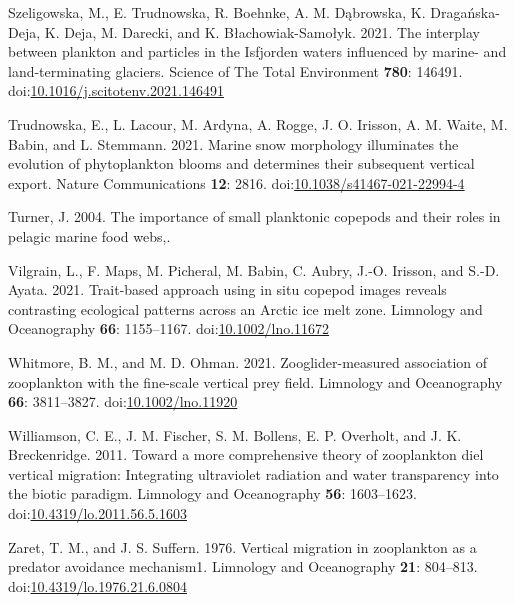 \documentclass[
]{article}
\newlength{\cslhangindent}
\newlength{\cslentryspacingunit} %
\newenvironment{CSLReferences}[2] %
 {%
  \setlength{\parindent}{0pt}
  \ifodd #1
  \let\oldpar\par
  \def\par{\hangindent=\cslhangindent\oldpar}
  \fi
  \setlength{\parskip}{#2\cslentryspacingunit}
 }%
 {}
\begin{document}
\begin{CSLReferences}{1}{0}
\leavevmode{}%
Szeligowska, M., E. Trudnowska, R. Boehnke, A. M. Dąbrowska, K.
Dragańska-Deja, K. Deja, M. Darecki, and K. Błachowiak-Samołyk. 2021.
The interplay between plankton and particles in the Isfjorden waters
influenced by marine- and land-terminating glaciers. Science of The
Total Environment \textbf{780}: 146491.
doi:\href{https://doi.org/10.1016/j.scitotenv.2021.146491}{10.1016/j.scitotenv.2021.146491}

\leavevmode{}%
Trudnowska, E., L. Lacour, M. Ardyna, A. Rogge, J. O. Irisson, A. M.
Waite, M. Babin, and L. Stemmann. 2021. Marine snow morphology
illuminates the evolution of phytoplankton blooms and determines their
subsequent vertical export. Nature Communications \textbf{12}: 2816.
doi:\href{https://doi.org/10.1038/s41467-021-22994-4}{10.1038/s41467-021-22994-4}

\leavevmode{}%
Turner, J. 2004. The importance of small planktonic copepods and their
roles in pelagic marine food webs,.

\leavevmode{}%
Vilgrain, L., F. Maps, M. Picheral, M. Babin, C. Aubry, J.-O. Irisson,
and S.-D. Ayata. 2021. Trait-based approach using in situ copepod images
reveals contrasting ecological patterns across an Arctic ice melt zone.
Limnology and Oceanography \textbf{66}: 1155--1167.
doi:\href{https://doi.org/10.1002/lno.11672}{10.1002/lno.11672}

\leavevmode{}%
Whitmore, B. M., and M. D. Ohman. 2021. Zooglider-measured association
of zooplankton with the fine-scale vertical prey field. Limnology and
Oceanography \textbf{66}: 3811--3827.
doi:\href{https://doi.org/10.1002/lno.11920}{10.1002/lno.11920}

\leavevmode{}%
Williamson, C. E., J. M. Fischer, S. M. Bollens, E. P. Overholt, and J.
K. Breckenridge. 2011. Toward a more comprehensive theory of zooplankton
diel vertical migration: Integrating ultraviolet radiation and water
transparency into the biotic paradigm. Limnology and Oceanography
\textbf{56}: 1603--1623.
doi:\href{https://doi.org/10.4319/lo.2011.56.5.1603}{10.4319/lo.2011.56.5.1603}

\leavevmode{}%
Zaret, T. M., and J. S. Suffern. 1976. Vertical migration in zooplankton
as a predator avoidance mechanism1. Limnology and Oceanography
\textbf{21}: 804--813.
doi:\href{https://doi.org/10.4319/lo.1976.21.6.0804}{10.4319/lo.1976.21.6.0804}

\end{CSLReferences}
\end{document}
